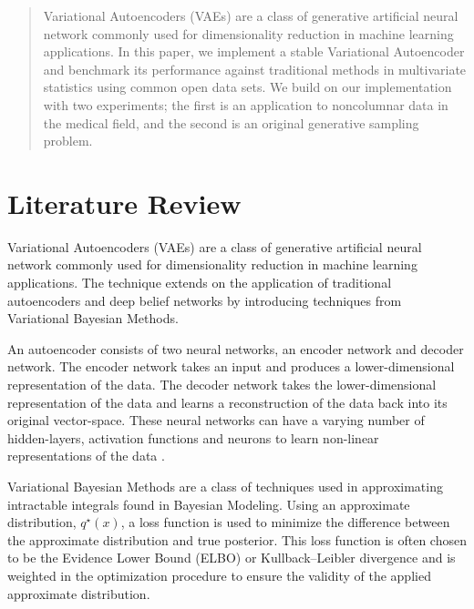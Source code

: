 \documentclass[12pt]{article}
\begin{document}


\begin{abstract}


\noindent Variational Autoencoders (VAEs) are a class of generative artificial neural network commonly used for dimensionality reduction in machine learning applications.  In this paper, we implement a stable Variational Autoencoder and benchmark its performance against traditional methods in multivariate statistics using common open data sets. We build on our implementation with two experiments; the first is an application to noncolumnar data in the medical field, and the second is an original generative sampling problem.  

\end{abstract}


\tableofcontents
\pagebreak

\section{Literature Review}
Variational Autoencoders (VAEs) are a class of generative artificial neural network commonly used for dimensionality reduction in machine learning applications.  The technique extends on the application of traditional autoencoders and deep belief networks by introducing techniques from Variational Bayesian Methods.  

An autoencoder consists of two neural networks, an encoder network and decoder network. The encoder network takes an input and produces a lower-dimensional representation of the data. The decoder network takes the lower-dimensional representation of the data and learns a reconstruction of the data back into its original vector-space. These neural networks can have a varying number of hidden-layers, activation functions and neurons to learn non-linear representations of the data \citep{Bengio2007, Bengio2013}.  

Variational Bayesian Methods are a class of techniques used in approximating intractable integrals found in Bayesian Modeling.  Using an approximate distribution, $q^\star(x)$, a loss function is used to minimize the difference between the approximate distribution and true posterior.  This loss function is often chosen to be the Evidence Lower Bound (ELBO) or Kullback–Leibler divergence and is weighted in the optimization procedure to ensure the validity of the applied approximate distribution.   
\end{document}
